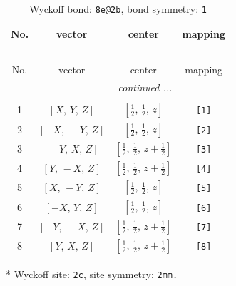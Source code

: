 \documentclass[fleqn,8pt]{jsarticle}
\begin{document}
\begin{longtable}{cccc}
\caption{Wyckoff bond: {\tt 8e@2b}, bond symmetry: {\tt 1}}
 \\
 \hline \hline
No. & vector & center & mapping \\ \hline \endfirsthead

\multicolumn{3}{l}{\tablename\ \thetable{}} \\
 \hline \hline
No. & vector & center & mapping \\ \hline \endhead

 \hline \hline
\multicolumn{3}{r}{\footnotesize\it continued ...} \\ \endfoot

 \hline \hline
\multicolumn{3}{r}{} \\ \endlastfoot

1 & $\left[ X,\, Y,\, Z \right]$ & $\left[ \frac{1}{2},\, \frac{1}{2},\, z \right]$ & {\tt [1]} \\ \hline
2 & $\left[ - X,\, - Y,\, Z \right]$ & $\left[ \frac{1}{2},\, \frac{1}{2},\, z \right]$ & {\tt [2]} \\ \hline
3 & $\left[ - Y,\, X,\, Z \right]$ & $\left[ \frac{1}{2},\, \frac{1}{2},\, z + \frac{1}{2} \right]$ & {\tt [3]} \\ \hline
4 & $\left[ Y,\, - X,\, Z \right]$ & $\left[ \frac{1}{2},\, \frac{1}{2},\, z + \frac{1}{2} \right]$ & {\tt [4]} \\ \hline
5 & $\left[ X,\, - Y,\, Z \right]$ & $\left[ \frac{1}{2},\, \frac{1}{2},\, z \right]$ & {\tt [5]} \\ \hline
6 & $\left[ - X,\, Y,\, Z \right]$ & $\left[ \frac{1}{2},\, \frac{1}{2},\, z \right]$ & {\tt [6]} \\ \hline
7 & $\left[ - Y,\, - X,\, Z \right]$ & $\left[ \frac{1}{2},\, \frac{1}{2},\, z + \frac{1}{2} \right]$ & {\tt [7]} \\ \hline
8 & $\left[ Y,\, X,\, Z \right]$ & $\left[ \frac{1}{2},\, \frac{1}{2},\, z + \frac{1}{2} \right]$ & {\tt [8]} \\
\end{longtable}
* Wyckoff site: {\tt 2c}, site symmetry: {\tt 2mm.}
\renewcommand{\arraystretch}{1.2}
\end{document}
